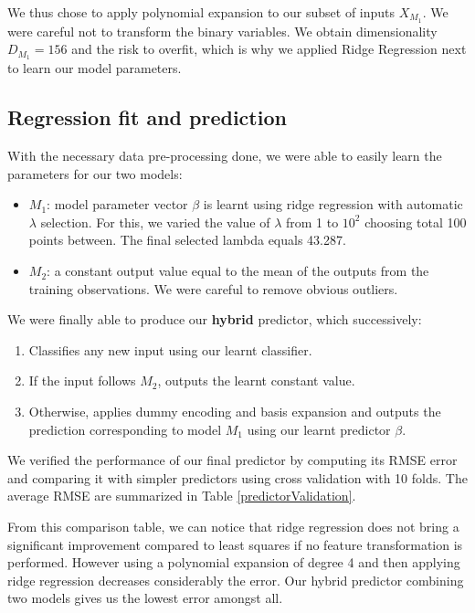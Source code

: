 \documentclass{article} %
\begin{document}
  We thus chose to apply polynomial expansion to our subset of inputs $X_{M_1}$. We were careful not to transform the binary variables. We obtain dimensionality $D_{M_1} = 156$ and the risk to overfit, which is why we applied Ridge Regression next to learn our model parameters.

  \subsection{Regression fit and prediction}
  With the necessary data pre-processing done, we were able to easily learn the parameters for our two models:
  \begin{itemize}
    \item $M_1$: model parameter vector $\beta$ is learnt using ridge regression with automatic $\lambda$ selection. For this, we varied the value of $\lambda$ from 1 to $10^2$ choosing total 100 points between. The final selected lambda equals 43.287.
    \item $M_2$: a constant output value equal to the mean of the outputs from the training observations. We were careful to remove obvious outliers.
  \end{itemize}

  We were finally able to produce our \textbf{hybrid} predictor, which successively:
  \begin{enumerate}
    \item Classifies any new input using our learnt classifier.
    \item If the input follows $M_2$, outputs the learnt constant value.
    \item Otherwise, applies dummy encoding and basis expansion and outputs the prediction corresponding to model $M_1$ using our learnt predictor $\beta$.
  \end{enumerate}

  We verified the performance of our final predictor by computing its RMSE error and comparing it with simpler predictors using cross validation with 10 folds. The average RMSE are summarized in Table \ref{predictorValidation}. 
  
  From this comparison table, we can notice that ridge regression does not bring a significant improvement compared to least squares if no feature transformation is performed. However using a polynomial expansion of degree 4 and then applying ridge regression decreases considerably the error. Our hybrid predictor combining two models gives us the lowest error amongst all.
\end{document}
